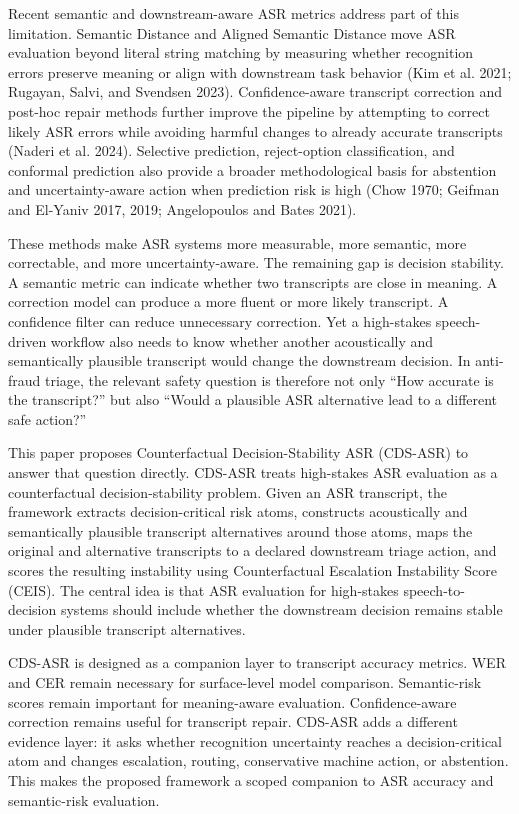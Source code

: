 \documentclass[
]{article}
\begin{document}
Recent semantic and downstream-aware ASR metrics address part of this
limitation. Semantic Distance and Aligned Semantic Distance move ASR
evaluation beyond literal string matching by measuring whether
recognition errors preserve meaning or align with downstream task
behavior (Kim et al. 2021; Rugayan, Salvi, and Svendsen 2023).
Confidence-aware transcript correction and post-hoc repair methods
further improve the pipeline by attempting to correct likely ASR errors
while avoiding harmful changes to already accurate transcripts (Naderi
et al. 2024). Selective prediction, reject-option classification, and
conformal prediction also provide a broader methodological basis for
abstention and uncertainty-aware action when prediction risk is high
(Chow 1970; Geifman and El-Yaniv 2017, 2019; Angelopoulos and Bates
2021).

These methods make ASR systems more measurable, more semantic, more
correctable, and more uncertainty-aware. The remaining gap is decision
stability. A semantic metric can indicate whether two transcripts are
close in meaning. A correction model can produce a more fluent or more
likely transcript. A confidence filter can reduce unnecessary
correction. Yet a high-stakes speech-driven workflow also needs to know
whether another acoustically and semantically plausible transcript would
change the downstream decision. In anti-fraud triage, the relevant
safety question is therefore not only ``How accurate is the transcript?''
but also ``Would a plausible ASR alternative lead to a different safe
action?''

This paper proposes Counterfactual Decision-Stability ASR (CDS-ASR) to
answer that question directly. CDS-ASR treats high-stakes ASR evaluation
as a counterfactual decision-stability problem. Given an ASR transcript,
the framework extracts decision-critical risk atoms, constructs
acoustically and semantically plausible transcript alternatives around
those atoms, maps the original and alternative transcripts to a declared
downstream triage action, and scores the resulting instability using
Counterfactual Escalation Instability Score (CEIS). The central idea is
that ASR evaluation for high-stakes speech-to-decision systems should
include whether the downstream decision remains stable under plausible
transcript alternatives.

CDS-ASR is designed as a companion layer to transcript accuracy metrics.
WER and CER remain necessary for surface-level model comparison.
Semantic-risk scores remain important for meaning-aware evaluation.
Confidence-aware correction remains useful for transcript repair.
CDS-ASR adds a different evidence layer: it asks whether recognition
uncertainty reaches a decision-critical atom and changes escalation,
routing, conservative machine action, or abstention. This makes the
proposed framework a scoped companion to ASR accuracy and semantic-risk
evaluation.
\end{document}
